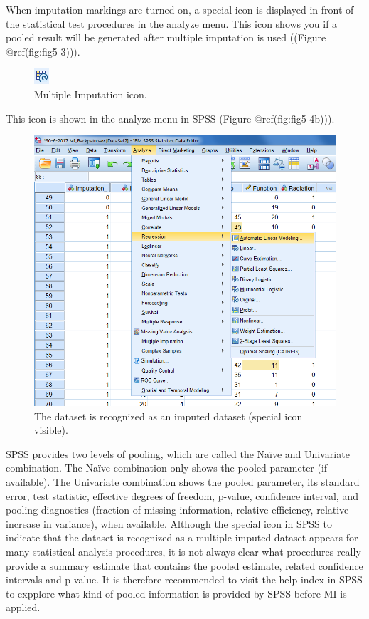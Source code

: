 \documentclass[
]{book}
\begin{document}
When imputation markings are turned on, a special icon is displayed in
front of the statistical test procedures in the analyze menu. This icon
shows you if a pooled result will be generated after multiple imputation
is used ((Figure @ref(fig:fig5-3))).

\begin{figure}

{\centering \includegraphics[width=0.05\linewidth]{images/fig5.3} 

}

\caption{Multiple Imputation icon.}\label{fig:fig5-3}
\end{figure}

This icon is shown in the analyze menu in SPSS (Figure
@ref(fig:fig5-4b))).

\begin{figure}

{\centering \includegraphics[width=0.9\linewidth]{images/fig5.4b} 

}

\caption{The dataset is recognized as an imputed dataset (special icon visible).}\label{fig:fig5-4b}
\end{figure}

SPSS provides two levels of pooling, which are called the Naïve and
Univariate combination. The Naïve combination only shows the pooled
parameter (if available). The Univariate combination shows the pooled
parameter, its standard error, test statistic, effective degrees of
freedom, p-value, confidence interval, and pooling diagnostics (fraction
of missing information, relative efficiency, relative increase in
variance), when available. Although the special icon in SPSS to indicate
that the dataset is recognized as a multiple imputed dataset appears for
many statistical analysis procedures, it is not always clear what
procedures really provide a summary estimate that contains the pooled
estimate, related confidence intervals and p-value. It is therefore
recommended to visit the help index in SPSS to expplore what kind of
pooled information is provided by SPSS before MI is applied.
\end{document}
